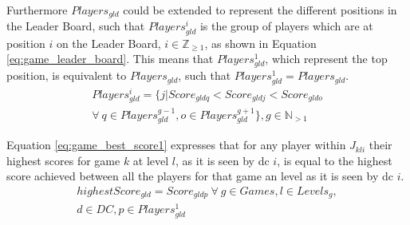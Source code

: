 Furthermore $Players_{gld}$ could be extended to represent the different positions in the Leader Board, such that $Players^{i}_{gld}$ is the group of players which are at position $i$ on the Leader Board, $i \in \mathbb{Z}_{\ge 1}$, as shown in Equation \ref{eq:game_leader_board}. This means that $Players^{1}_{gld}$, which represent the top position, is equivalent to $Players_{gld}$, such that $Players^{1}_{gld} = Players_{gld}$.
\begin{multline} \label{eq:game_leader_board}
	Players^{i}_{gld} = \{j | Score_{gldq} < Score_{gldj} < Score_{gldo}\\ \forall ~ q \in Players^{g-1}_{gld}, o \in Players^{g+1}_{gld}\}, g \in \mathbb{N}_{> 1}
\end{multline}

Equation \ref{eq:game_best_score1} expresses that for any player within $J_{kli}$ their highest scores for game $k$ at level $l$, as it is seen by \gls{dc} $i$, is equal to the highest score achieved between all the players for that game an level as it is seen by \gls{dc} $i$.
\begin{multline} \label{eq:game_best_score1}
	highestScore_{gld} = Score_{gldp} ~ \forall ~ g \in Games, l \in Levels_{g},\\ d \in  DC, p \in Players^{1}_{gld}
\end{multline}
